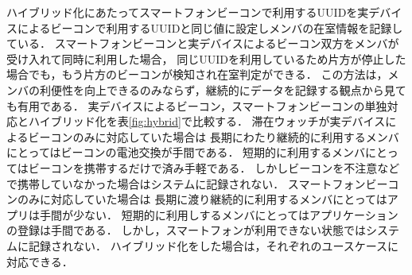 ハイブリッド化にあたってスマートフォンビーコンで利用するUUIDを実デバイスによるビーコンで利用するUUIDと同じ値に設定しメンバの在室情報を記録している．
スマートフォンビーコンと実デバイスによるビーコン双方をメンバが受け入れて同時に利用した場合，
同じUUIDを利用しているため片方が停止した場合でも，もう片方のビーコンが検知され在室判定ができる．
この方法は，メンバの利便性を向上できるのみならず，継続的にデータを記録する観点から見ても有用である．
実デバイスによるビーコン，スマートフォンビーコンの単独対応とハイブリッド化を表\ref{fig:hybrid}で比較する．
 滞在ウォッチが実デバイスによるビーコンのみに対応していた場合は
長期にわたり継続的に利用するメンバにとってはビーコンの電池交換が手間である．
短期的に利用するメンバにとってはビーコンを携帯するだけで済み手軽である．
しかしビーコンを不注意などで携帯していなかった場合はシステムに記録されない．
スマートフォンビーコンのみに対応していた場合は
長期に渡り継続的に利用するメンバにとってはアプリは手間が少ない．
短期的に利用しするメンバにとってはアプリケーションの登録は手間である．
しかし，スマートフォンが利用できない状態ではシステムに記録されない．
ハイブリッド化をした場合は，それぞれのユースケースに対応できる．

